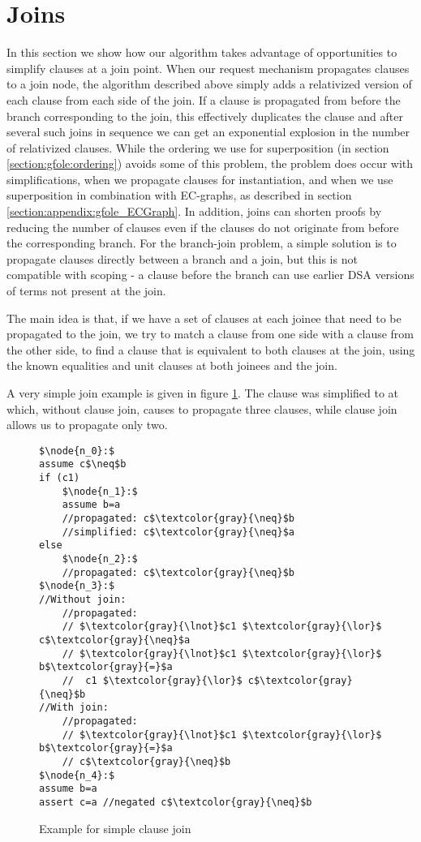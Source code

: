 \section{Joins}\label{section:gfole:joins}

In this section we show how our algorithm takes advantage of opportunities to simplify clauses at a join point.
When our request mechanism propagates clauses to a join node, the algorithm described above simply adds a relativized version of each clause from each side of the join. If a clause is propagated from before the branch corresponding to the join, this effectively duplicates the clause and after several such joins in sequence we can get an exponential explosion in the number of relativized clauses.
While the ordering we use for superposition (in section \ref{section:gfole:ordering}) avoids some of this problem, the problem does occur with simplifications, when we propagate clauses for instantiation, and when we use superposition in combination with EC-graphs, as described in section \ref{section:appendix:gfole_ECGraph}. In addition, joins can shorten proofs by reducing the number of clauses even if the clauses do not originate from before the corresponding branch.
For the branch-join problem, a simple solution is to propagate clauses directly between a branch and a join, but this is not compatible with scoping - a clause before the branch can use earlier DSA versions of terms not present at the join. 

The main idea is that, if we have a set of clauses at each joinee that need to be propagated to the join, we try to match a clause from one side with a clause from the other side, to find a clause that is equivalent to both clauses at the join, using the known equalities and unit clauses at both joinees and the join.

A very simple join example is given in figure \ref{snippet4.1.3.0}. The clause  was simplified to  at  
which, without clause join, causes  to propagate three clauses, while clause join allows us to propagate only two. 

\begin{figure}
\begin{lstlisting}
$\node{n_0}:$
assume c$\neq$b
if (c1)
	$\node{n_1}:$	
	assume b=a
	//propagated: c$\textcolor{gray}{\neq}$b
	//simplified: c$\textcolor{gray}{\neq}$a
else	
	$\node{n_2}:$
	//propagated: c$\textcolor{gray}{\neq}$b
$\node{n_3}:$
//Without join:
	//propagated: 
	// $\textcolor{gray}{\lnot}$c1 $\textcolor{gray}{\lor}$ c$\textcolor{gray}{\neq}$a
	// $\textcolor{gray}{\lnot}$c1 $\textcolor{gray}{\lor}$ b$\textcolor{gray}{=}$a
	//  c1 $\textcolor{gray}{\lor}$ c$\textcolor{gray}{\neq}$b
//With join:
	//propagated: 
	// $\textcolor{gray}{\lnot}$c1 $\textcolor{gray}{\lor}$ b$\textcolor{gray}{=}$a
	// c$\textcolor{gray}{\neq}$b
$\node{n_4}:$
assume b=a
assert c=a //negated c$\textcolor{gray}{\neq}$b
\end{lstlisting}
\caption{Example for simple clause join\\
}
\label{snippet4.1.3.0}
\end{figure}



